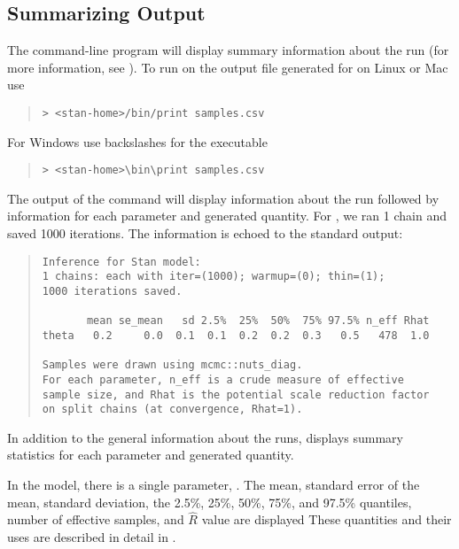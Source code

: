 \subsection{Summarizing Output}

The command-line program  will display summary
information about the run (for more information, see
). To run  on the output file
generated for  on Linux or Mac use
%
\begin{quote}
\begin{Verbatim}[fontshape=sl]
> <stan-home>/bin/print samples.csv
\end{Verbatim}
\end{quote}
%
For Windows use backslashes for the executable
%
\begin{quote}
\begin{Verbatim}[fontshape=sl]
> <stan-home>\bin\print samples.csv
\end{Verbatim}
\end{quote}
%
The output of the command will display information about the run
followed by information for each parameter and generated quantity. For
, we ran 1 chain and saved 1000 iterations. The information is
echoed to the standard output:
%
\begin{quote}
{\small
\begin{Verbatim}[fontshape=sl]
Inference for Stan model:
1 chains: each with iter=(1000); warmup=(0); thin=(1); 
1000 iterations saved.

       mean se_mean   sd 2.5%  25%  50%  75% 97.5% n_eff Rhat
theta   0.2     0.0  0.1  0.1  0.2  0.2  0.3   0.5   478  1.0

Samples were drawn using mcmc::nuts_diag.
For each parameter, n_eff is a crude measure of effective 
sample size, and Rhat is the potential scale reduction factor 
on split chains (at convergence, Rhat=1).
\end{Verbatim}
}
\end{quote}
%
In addition to the general information about the runs, 
displays summary statistics for each parameter and generated
quantity.

In the  model, there is a single parameter,
. The mean, standard error of the mean, standard
deviation, the 2.5\%, 25\%, 50\%, 75\%, and 97.5\% quantiles,
number of effective samples, and $\hat{R}$ value are displayed
These quantities and their uses are described in detail in 
.

